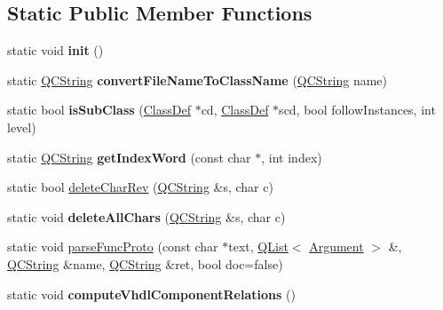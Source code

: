 \subsection*{Static Public Member Functions}
\begin{DoxyCompactItemize}
\item 
\mbox{\label{class_vhdl_doc_gen_a987fee1e906fac322dda62613525a8f9}} 
static void {\bfseries init} ()
\item 
\mbox{\label{class_vhdl_doc_gen_ac5508320d1d3754b484107c49cfec5a7}} 
static \mbox{\hyperlink{class_q_c_string}{Q\+C\+String}} {\bfseries convert\+File\+Name\+To\+Class\+Name} (\mbox{\hyperlink{class_q_c_string}{Q\+C\+String}} name)
\item 
\mbox{\label{class_vhdl_doc_gen_ac7d0f125a2bffca08e8c52644bf8c6f2}} 
static bool {\bfseries is\+Sub\+Class} (\mbox{\hyperlink{class_class_def}{Class\+Def}} $\ast$cd, \mbox{\hyperlink{class_class_def}{Class\+Def}} $\ast$scd, bool follow\+Instances, int level)
\item 
\mbox{\label{class_vhdl_doc_gen_aede8c70a47e630b7a4b562b599304121}} 
static \mbox{\hyperlink{class_q_c_string}{Q\+C\+String}} {\bfseries get\+Index\+Word} (const char $\ast$, int index)
\item 
static bool \mbox{\hyperlink{class_vhdl_doc_gen_a82a05cf7bd081febd19a0065eed17098}{delete\+Char\+Rev}} (\mbox{\hyperlink{class_q_c_string}{Q\+C\+String}} \&s, char c)
\item 
\mbox{\label{class_vhdl_doc_gen_ae4bf0d0561d8ef807b56c1f29765713e}} 
static void {\bfseries delete\+All\+Chars} (\mbox{\hyperlink{class_q_c_string}{Q\+C\+String}} \&s, char c)
\item 
static void \mbox{\hyperlink{class_vhdl_doc_gen_a42d423663159ccd360d8838005662343}{parse\+Func\+Proto}} (const char $\ast$text, \mbox{\hyperlink{class_q_list}{Q\+List}}$<$ \mbox{\hyperlink{struct_argument}{Argument}} $>$ \&, \mbox{\hyperlink{class_q_c_string}{Q\+C\+String}} \&name, \mbox{\hyperlink{class_q_c_string}{Q\+C\+String}} \&ret, bool doc=false)
\item 
\mbox{\label{class_vhdl_doc_gen_ab8681769cd2f027fbf46a4836d3825e9}} 
static void {\bfseries compute\+Vhdl\+Component\+Relations} ()

\end{DoxyCompactItemize}
